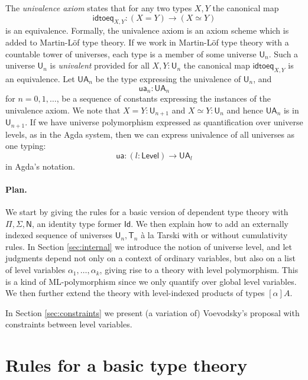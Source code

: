 \documentclass[11pt,a4paper]{article}
\newcommand{\Id}{\mathsf{Id}}
\def\NN{\mathsf{N}}
\def\UU{\mathsf{U}}
\def\Level{\mathsf{Level}}
\newcommand{\T}{\mathsf{T}}
\newcommand{\idtoeq}{\mathsf{idtoeq}}
\newcommand{\ua}{\mathsf{ua}}
\newcommand{\UA}{\mathsf{UA}}
\begin{document}
The {\em univalence axiom} states that for any two types $X,Y$ the canonical map
$$
\idtoeq_{X,Y} : (X=Y)\to (X\simeq Y)
$$
is an equivalence. Formally, the univalence axiom is an axiom scheme which is added to Martin-Löf type theory. If we work in Martin-Löf type theory with a countable tower of universes, each type is a member of some universe $\UU_n$. Such a universe $\UU_n$ is {\em univalent} provided for all $X,Y : \UU_n$ the canonical map $\idtoeq_{X,Y}$ is an equivalence. Let $\UA_n$ be the type expressing the univalence of $\UU_n$, and
$$
\ua_n : \UA_n
$$
for $n = 0,1,\ldots$, be a sequence of constants expressing the instances of the univalence axiom. We note that $X = Y : \UU_{n+1}$ and $X\simeq Y : \UU_n$ and hence $\UA_n$ is in $\UU_{n+1}$. If we have universe polymorphism expressed as quantification over universe levels, as in the Agda system, then we can express univalence of all universes as one typing:
$$
\ua : (l : \Level) \to \UA_l
$$
in Agda's notation.

\paragraph{Plan.} We start by giving the rules for a basic version of dependent type theory with
$\Pi, \Sigma, \NN$, an identity type former $\Id$.
We then explain how to add an externally indexed sequence of universes $\UU_n, \T_n$ \`a la Tarski with or without
cumulativity rules.
In Section \ref{sec:internal} we introduce the notion of universe level, and let judgments depend not only on a context of ordinary variables, but also on a list of level variables $\alpha_1, \ldots, \alpha_k$, giving rise to a theory with level polymorphism. This is a kind of ML-polymorphism since we only quantify over global level variables. We then further extend the theory with level-indexed products of types $[\alpha]A$.

In Section \ref{sec:constraints} we present (a variation of) Voevodsky's proposal with constraints between level variables. 



\section{Rules for a basic type theory}
\end{document}
